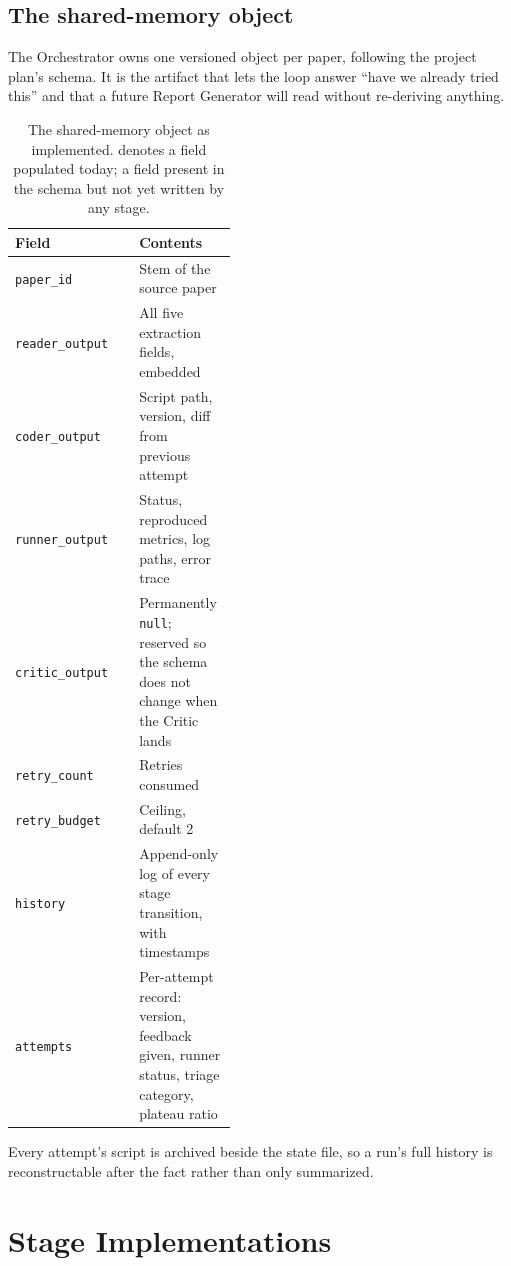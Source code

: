 \documentclass[10pt,twocolumn]{article}
\newcommand{\built}{\textcolor{builtc}{\ding{51}}}
\newcommand{\absent}{\textcolor{missingc}{\ding{55}}}
\begin{document}
\subsection{The shared-memory object}

The Orchestrator owns one versioned object per paper, following the project plan's schema.
It is the artifact that lets the loop answer ``have we already tried this'' and that a
future Report Generator will read without re-deriving anything.

\begin{table}[htbp]
\centering
\small
\caption{The shared-memory object as implemented. \built{} denotes a field populated
today; \absent{} a field present in the schema but not yet written by any stage.}
\label{tab:state}
\begin{tabular}{llp{0.44\linewidth}}
\toprule
Field & & Contents \\
\midrule
\texttt{paper\_id}          & \built & Stem of the source paper \\
\texttt{reader\_output}     & \built & All five extraction fields, embedded \\
\texttt{coder\_output}      & \built & Script path, version, diff from previous attempt \\
\texttt{runner\_output}     & \built & Status, reproduced metrics, log paths, error trace \\
\texttt{critic\_output}     & \absent & Permanently \texttt{null}; reserved so the schema
                                        does not change when the Critic lands \\
\texttt{retry\_count}       & \built & Retries consumed \\
\texttt{retry\_budget}      & \built & Ceiling, default 2 \\
\texttt{history}            & \built & Append-only log of every stage transition, with
                                        timestamps \\
\texttt{attempts}           & \built & Per-attempt record: version, feedback given, runner
                                        status, triage category, plateau ratio \\
\bottomrule
\end{tabular}
\end{table}

Every attempt's script is archived beside the state file, so a run's full history is
reconstructable after the fact rather than only summarized.

\section{Stage Implementations}
\label{sec:stages}
\end{document}
